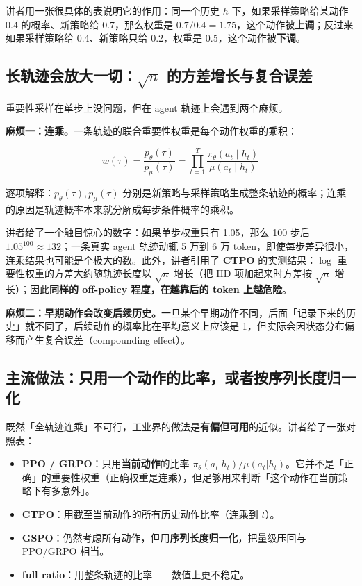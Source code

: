 \documentclass[a4paper]{article}
\begin{document}
讲者用一张很具体的表说明它的作用：同一个历史 $h$ 下，如果采样策略给某动作 0.4 的概率、新策略给 0.7，那么权重是 $0.7/0.4=1.75$，这个动作被\textbf{上调}；反过来如果采样策略给 0.4、新策略只给 0.2，权重是 0.5，这个动作被\textbf{下调}。

\subsection{长轨迹会放大一切：$\sqrt{n}$ 的方差增长与复合误差}

重要性采样在单步上没问题，但在 agent 轨迹上会遇到两个麻烦。

\textbf{麻烦一：连乘。}一条轨迹的联合重要性权重是每个动作权重的乘积：

$$w(\tau) = \frac{p_\theta(\tau)}{p_\mu(\tau)} = \prod_{t=1}^{T}\frac{\pi_\theta(a_t \mid h_t)}{\mu(a_t \mid h_t)}$$

逐项解释：$p_\theta(\tau), p_\mu(\tau)$ 分别是新策略与采样策略生成整条轨迹的概率；连乘的原因是轨迹概率本来就分解成每步条件概率的乘积。

讲者给了一个触目惊心的数字：如果单步权重只有 1.05，那么 100 步后 $1.05^{100}\approx 132$；一条真实 agent 轨迹动辄 5 万到 6 万 token，即使每步差异很小，连乘结果也可能是个极大的数。此外，讲者引用了 \textbf{CTPO} 的实测结果：$\log$ 重要性权重的方差大约随轨迹长度以 $\sqrt{n}$ 增长（把 IID 项加起来时方差按 $\sqrt{n}$ 增长）；因此\textbf{同样的 off-policy 程度，在越靠后的 token 上越危险}。

\textbf{麻烦二：早期动作会改变后续历史。}一旦某个早期动作不同，后面「记录下来的历史」就不同了，后续动作的概率比在平均意义上应该是 1，但实际会因状态分布偏移而产生复合误差（compounding effect）。

\subsection{主流做法：只用一个动作的比率，或者按序列长度归一化}

既然「全轨迹连乘」不可行，工业界的做法是\textbf{有偏但可用}的近似。讲者给了一张对照表：

\begin{itemize}
\item \textbf{PPO / GRPO}：只用\textbf{当前动作}的比率 $\pi_\theta(a_t|h_t)/\mu(a_t|h_t)$。它并不是「正确」的重要性权重（正确权重是连乘），但足够用来判断「这个动作在当前策略下有多意外」。
\item \textbf{CTPO}：用截至当前动作的所有历史动作比率（连乘到 $t$）。
\item \textbf{GSPO}：仍然考虑所有动作，但用\textbf{序列长度归一化}，把量级压回与 PPO/GRPO 相当。
\item \textbf{full ratio}：用整条轨迹的比率——数值上更不稳定。
\end{itemize}
\end{document}
